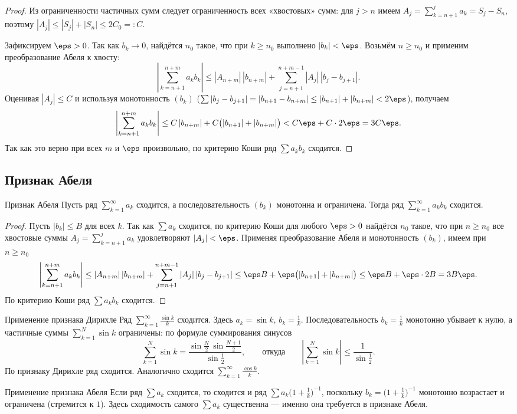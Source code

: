 \begin{proof}
	Из ограниченности частичных сумм следует ограниченность всех «хвостовых»
	сумм: для $j>n$ имеем $A_j=\sum_{k=n+1}^{j} a_k=S_j-S_n$, поэтому
	$|A_j|\le|S_j|+|S_n|\le 2C_0=:C$.

	Зафиксируем $\eps>0$. Так как $b_k\to0$, найдётся $n_0$ такое, что при
	$k\ge n_0$ выполнено $|b_k|<\eps$. Возьмём $n\ge n_0$ и применим
	преобразование Абеля к хвосту:
	\[
	\left|\sum_{k=n+1}^{n+m} a_k b_k\right|
	\le |A_{n+m}|\,|b_{n+m}|
	+\sum_{j=n+1}^{n+m-1} |A_j|\,|b_j-b_{j+1}|.
	\]
	Оценивая $|A_j|\le C$ и используя монотонность $(b_k)$
	($\sum|b_j-b_{j+1}|=|b_{n+1}-b_{n+m}|\le|b_{n+1}|+|b_{n+m}|<2\eps$), получаем
	\[
	\left|\sum_{k=n+1}^{n+m} a_k b_k\right|
	\le C\,|b_{n+m}|+C\bigl(|b_{n+1}|+|b_{n+m}|\bigr)
	< C\eps+C\cdot 2\eps=3C\eps.
	\]
	Так как это верно при всех $m$ и $\eps$ произвольно, по критерию Коши ряд
	$\sum a_k b_k$ сходится.
\end{proof}

\subsection*{Признак Абеля}

\begin{Theorem}{Признак Абеля}{}
	Пусть ряд $\sum_{k=1}^{\infty} a_k$ сходится, а последовательность $(b_k)$
	монотонна и ограничена. Тогда ряд $\sum_{k=1}^{\infty} a_k b_k$ сходится.
\end{Theorem}

\begin{proof}
	Пусть $|b_k|\le B$ для всех $k$. Так как $\sum a_k$ сходится, по критерию
	Коши для любого $\eps>0$ найдётся $n_0$ такое, что при $n\ge n_0$ все
	хвостовые суммы $A_j=\sum_{k=n+1}^{j} a_k$ удовлетворяют $|A_j|<\eps$.
	Применяя преобразование Абеля и монотонность $(b_k)$, имеем при $n\ge n_0$
	\[
	\left|\sum_{k=n+1}^{n+m} a_k b_k\right|
	\le |A_{n+m}|\,|b_{n+m}|+\sum_{j=n+1}^{n+m-1}|A_j|\,|b_j-b_{j+1}|
	\le \eps B+\eps\bigl(|b_{n+1}|+|b_{n+m}|\bigr)
	\le \eps B+\eps\cdot 2B=3B\eps.
	\]
	По критерию Коши ряд $\sum a_k b_k$ сходится.
\end{proof}

\begin{Example}{Применение признака Дирихле}{}
	Ряд $\displaystyle\sum_{k=1}^{\infty}\frac{\sin k}{k}$ сходится. Здесь
	$a_k=\sin k$, $b_k=\frac1k$. Последовательность $b_k=\frac1k$ монотонно
	убывает к нулю, а частичные суммы $\sum_{k=1}^{N}\sin k$ ограничены: по
	формуле суммирования синусов
	\[
	\sum_{k=1}^{N}\sin k=\frac{\sin\frac{N}{2}\,\sin\frac{N+1}{2}}{\sin\frac12},
	\qquad\text{откуда}\qquad
	\left|\sum_{k=1}^{N}\sin k\right|\le\frac{1}{\sin\frac12}.
	\]
	По признаку Дирихле ряд сходится. Аналогично сходится
	$\sum_{k=1}^{\infty}\frac{\cos k}{k}$.
\end{Example}

\begin{Example}{Применение признака Абеля}{}
	Если ряд $\sum a_k$ сходится, то сходится и ряд
	$\sum a_k\bigl(1+\tfrac1k\bigr)^{-1}$, поскольку
	$b_k=\bigl(1+\tfrac1k\bigr)^{-1}$ монотонно возрастает и ограничена
	(стремится к $1$). Здесь сходимость самого $\sum a_k$ существенна --- именно
	она требуется в признаке Абеля.
\end{Example}

